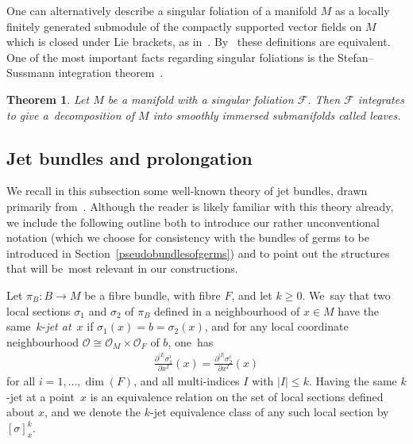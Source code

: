 \documentclass[11pt]{article}
\numberwithin{equation}{section}
\numberwithin{equation}{section}
\newtheorem{Theorem}{Theorem}[section]
\def\FF{{\mathcal{F}}}
\def\OO{{\mathcal{O}}}
\begin{document}
One can alternatively describe a singular foliation of a manifold $M$ as a locally finitely generated submodule of the compactly supported vector fields on $M$ which is closed under Lie brackets, as in~\cite{iakovos2}. By~\cite[Remark 1.8]{GarZam} these definitions are equivalent. One of the most important facts regarding singular foliations is the Stefan--Sussmann integration theorem~\cite{stefan, sussmann}.

\begin{Theorem}%
Let $M$ be a manifold with a singular foliation $\FF$. Then $\FF$ integrates to give a~decom\-position of $M$ into smoothly immersed submanifolds called leaves.
\end{Theorem}

\setcounter{Theorem}{4}
\subsection{Jet bundles and prolongation}

We recall in this subsection some well-known theory of jet bundles, drawn primarily from~\cite{varbi, saunders}. Although the reader is likely familiar with this theory already, we include the following outline both to introduce our rather unconventional notation (which we choose for consistency with the bundles of germs to be introduced in Section~\ref{pseudobundlesofgerms}) and to point out the structures that will be~most relevant in our constructions.

\begin{Definition}
Let $\pi_{B}\colon B\rightarrow M$ be a fibre bundle, with fibre $F$, and let $k\geq0$. We~say that two local sections $\sigma_{1}$ and $\sigma_{2}$ of $\pi_{B}$ defined in a neighbourhood of $x\in M$ have the same~$k$-\textit{jet at}~$x$ if $\sigma_{1}(x) =b= \sigma_{2}(x)$, and for any local coordinate neighbourhood $\OO\cong\OO_{M}\times\OO_{F}$ of $b$, one~has
\begin{gather*}
\frac{\partial^{|I|}\sigma^{i}_{1}}{\partial x^{I}}(x) = \frac{\partial^{|I|}\sigma^{i}_{2}}{\partial x^{I}}(x)
\end{gather*}
for all $i = 1,\dots,\dim(F)$, and all multi-indices $I$ with $|I|\leq k$. Having the same $k$-jet at a point~$x$ is an equivalence relation on the set of local sections defined about $x$, and we denote the $k$-jet equivalence class of any such local section by $[\sigma]^{k}_{x}$.
\end{Definition}
\end{document}
